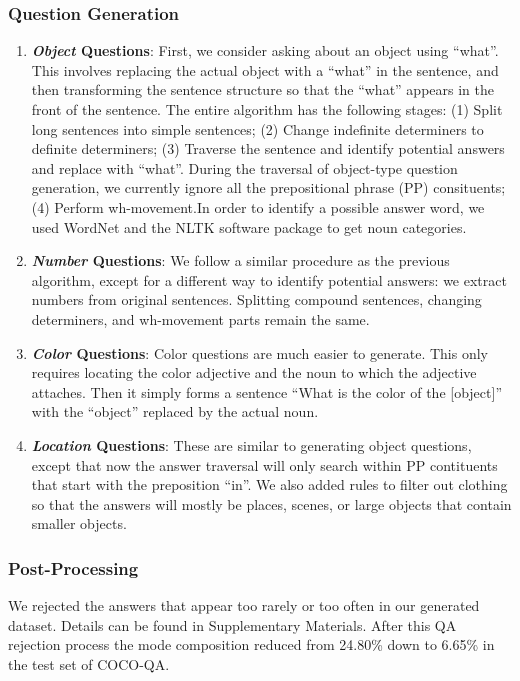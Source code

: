 \documentclass{article}
\renewcommand{\*}[1]{\textbf{#1}}
\begin{document}
\subsubsection{Question Generation}
\begin{enumerate}[leftmargin=*]
\item \*{{\it Object} Questions}:
First, we consider asking about an object using ``what''. This involves 
replacing the actual object with a ``what'' in the sentence, and then 
transforming the sentence structure so that the ``what'' appears in the front 
of the sentence. The entire algorithm has the following stages: (1) Split long 
sentences into simple sentences; (2) Change indefinite determiners to definite 
determiners; (3) Traverse the sentence and identify potential answers and 
replace with ``what''. During the traversal of object-type question 
generation, we currently ignore all the prepositional phrase (PP) consituents; 
(4) Perform wh-movement.In order to identify a possible answer word, we used 
WordNet \cite{wordnet} and the NLTK software package \cite{nltk} to get noun 
categories.

\item \*{{\it Number} Questions}:
We follow a similar procedure as the previous algorithm, except for a different 
way to identify potential answers: we extract numbers from original sentences. 
Splitting compound sentences, changing determiners, and wh-movement parts 
remain the same.

\item \*{{\it Color} Questions}:
Color questions are much easier to generate. This only requires locating the 
color adjective and the noun to which the adjective attaches. Then it simply 
forms a sentence ``What is the color of the [object]'' with the ``object'' 
replaced by the actual noun.

\item \*{{\it Location} Questions}:
These are similar to generating object questions, except that now the answer
traversal will only search within PP contituents that start with the 
preposition ``in''. We also added rules to filter out clothing so that the 
answers will mostly be places, scenes, or large objects that contain smaller 
objects.
\end{enumerate}

\subsubsection{Post-Processing}
We rejected the answers that appear too rarely or too often in our generated
dataset. Details can be found in Supplementary Materials. After this QA 
rejection process the mode composition reduced from 24.80\% down to 6.65\% in 
the test set of COCO-QA.
\end{document}
